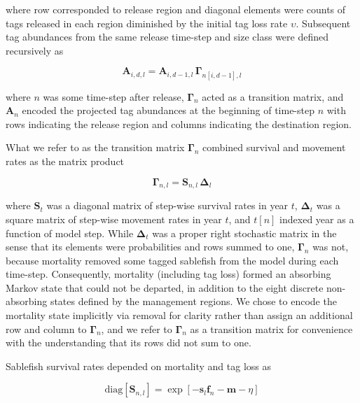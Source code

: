 \documentclass{article}
\begin{document}
where row corresponded to release region and diagonal elements were counts of tags released in each region diminished by the initial tag loss rate $\upsilon$. Subsequent tag abundances from the same release time-step and size class were defined recursively as 

\begin{equation}
    \label{eq:abundance}
    \boldsymbol{A}_{i,d,l} = \boldsymbol{A}_{i,d-1,l} \, \boldsymbol{\Gamma}_{n[i,d-1],l}
\end{equation}

\noindent where $n$ was some time-step after release, $\boldsymbol{\Gamma}_n$ acted as a transition matrix, and $\boldsymbol{A}_n$ encoded the projected tag abundances at the beginning of time-step $n$ with rows indicating the release region and columns indicating the destination region. 

What we refer to as the transition matrix $\boldsymbol{\Gamma}_n$ combined survival and movement rates as the matrix product

\begin{equation}
    \label{eq:transition}
    \boldsymbol{\Gamma}_{n,l} = \boldsymbol{S}_{n,l} \, \boldsymbol{\Delta}_{l}
\end{equation}

\noindent where $\boldsymbol{S}_t$ was a diagonal matrix of step-wise survival rates in year $t$, $\boldsymbol{\Delta}_t$ was a square matrix of step-wise movement rates in year $t$, and $t[n]$ indexed year as a function of model step. While $\boldsymbol{\Delta}_t$ was a proper right stochastic matrix in the sense that its elements were probabilities and rows summed to one, $\boldsymbol{\Gamma}_n$ was not, because mortality removed some tagged sablefish from the model during each time-step. Consequently, mortality (including tag loss) formed an absorbing Markov state that could not be departed, in addition to the eight discrete non-absorbing states defined by the management regions. We chose to encode the mortality state implicitly via removal for clarity rather than assign an additional row and column to $\boldsymbol{\Gamma}_n$, and we refer to $\boldsymbol{\Gamma}_n$ as a transition matrix for convenience with the understanding that its rows did not sum to one.

Sablefish survival rates depended on mortality and tag loss as

\begin{equation}
  \label{eq:survival}
  \mathrm{diag} \! \left[\boldsymbol{S}_{n,l}\right] = 
    \exp\!{\left[-\boldsymbol{s}_l \boldsymbol{f}_n - \boldsymbol{m} - \eta \right]}
\end{equation}
\end{document}
